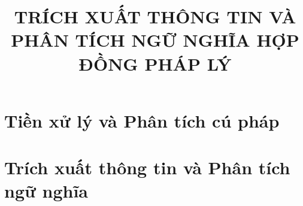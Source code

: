 \documentclass[oneside,final]{hcmut-report}
\title{TRÍCH XUẤT THÔNG TIN VÀ PHÂN TÍCH
NGỮ NGHĨA HỢP ĐỒNG PHÁP LÝ}
\begin{document}
\coverpage

\tableofcontents

\clearpage

\section{Tiền xử lý và Phân tích cú pháp}

\pagebreak

\pagebreak

\pagebreak
\section{Trích xuất thông tin và Phân tích ngữ nghĩa}

\pagebreak

\pagebreak

\end{document}
